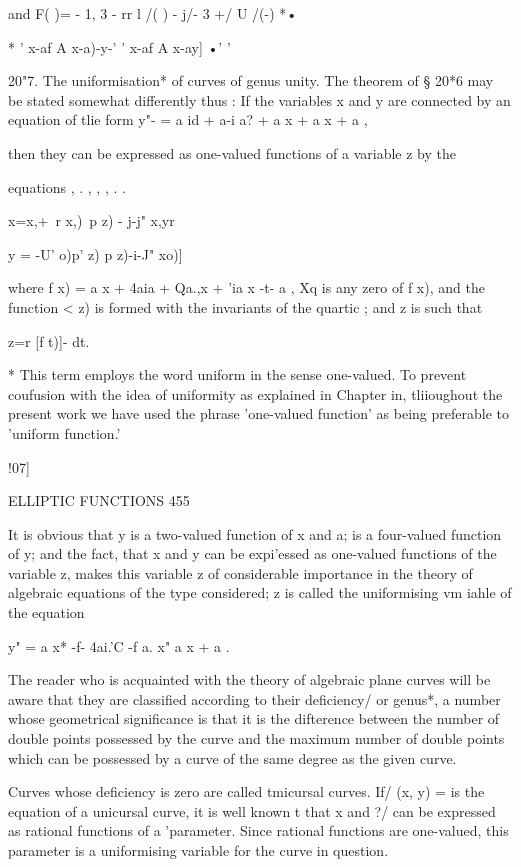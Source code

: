 {and F( )= - 1, 3 - rr l /( ) - j/- 3 +/ U /(-) *•

* ' x-af A x-a)-y-' ' x-af A x-ay] •' '

20"7. The uniformisation* of curves of genus unity. The theorem of §
20*6 may be stated somewhat differently thus : If the variables x and
y are connected by an equation of tlie form y"- = a id + a-i a? + a x
+ a x + a ,

then they can be expressed as one-valued functions of a variable z by
the

equations , . , , , . .

  x=x,+\ r x,)\ p z) - j-j" x,yr

y = -U' o)p' z) p z)-i-J" xo)]

where f x) = a x + 4aia + Qa.,x + 'ia x -t- a , Xq is any zero of f
x), and the function < z) is formed with the invariants of the quartic
; and z is such that

z=r [f t)]- dt.

* This term employs the word uniform in the sense one-valued. To
prevent coufusion with the idea of uniformity as explained in Chapter
in, tliioughout the present work we have used the phrase 'one-valued
function' as being preferable to 'uniform function.'

!07]

ELLIPTIC FUNCTIONS 455

It is obvious that y is a two-valued function of x and a; is a
four-valued function of y; and the fact, that x and y can be
expi'essed as one-valued functions of the variable z, makes this
variable z of considerable importance in the theory of algebraic
equations of the type considered; z is called the uniformising vm
iahle of the equation

y" = a x* -f- 4ai.'C -f a. x" a x + a .

The reader who is acquainted with the theory of algebraic plane curves
will be aware that they are classified according to their deficiency/
or genus*, a number whose geometrical significance is that it is the
difterence between the number of double points possessed by the curve
and the maximum number of double points which can be possessed by a
curve of the same degree as the given curve.

Curves whose deficiency is zero are called tmicursal curves. If/ (x,
y) = is the equation of a unicursal curve, it is well known t that x
and ?/ can be expressed as rational functions of a 'parameter. Since
rational functions are one-valued, this parameter is a uniformising
variable for the curve in question.

}
